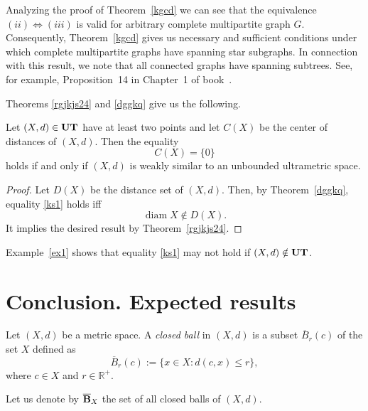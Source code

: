 \documentclass{article}
\begin{document}
\begin{Remark}
    Analyzing the proof of Theorem~\ref{kgcd} we can see that the equivalence $(ii) \Leftrightarrow (iii)$ is valid for arbitrary complete multipartite graph $G$.
Consequently, Theorem~\ref{kgcd} gives us necessary and sufficient conditions under which complete multipartite graphs have  spanning star subgraphs. In connection with this result, we note that all connected graphs have spanning subtrees. See, for example, Proposition~14 in Chapter~1 of book~\cite{SerreTrees1980}.
\end{Remark}






Theorems \ref{rgjkjs24} and \ref{dggkq} give us the following.

\begin{Corollary}
\label{shak}
Let $(X,d)\in {\bf  UT}$ have at least two points and let $C(X)$ be the center of distances of $(X,d)$.
Then the equality
\begin{equation}
    \label{ks1}
C(X)=\{0\}
\end{equation}
holds if and only if $(X,d)$ is weakly similar to an unbounded ultrametric space.
\end{Corollary}


\begin{proof}
Let $D(X)$ be the distance set of $(X,d)$.
Then, by Theorem~\ref{dggkq}, equality \eqref{ks1} holds iff
\[
\operatorname{diam} X \notin D(X).
\]
It implies the desired result by Theorem~\ref{rgjkjs24}.
\end{proof}

\begin{Remark}
    \label{oiuw}
Example~\ref{ex1} shows that equality \eqref{ks1} may not hold if $(X,d)\notin {\bf UT}$.
\end{Remark}






\section{Conclusion. Expected results}\label{sec6}

Let $(X,d)$ be a metric space.
A {\it closed ball} in $(X,d)$ is a subset $\overline{B}_r(c)$ of the set $X$ defined as
\[
\overline{B}_r(c):=\{x\in X \colon d(c,x)\leq r\},
\]
where $c\in X$ and $r\in\mathbb{R}^+$.

Let us denote by $\overline{\bf B}_X$ the set of all closed balls of $(X,d)$.
\end{document}
